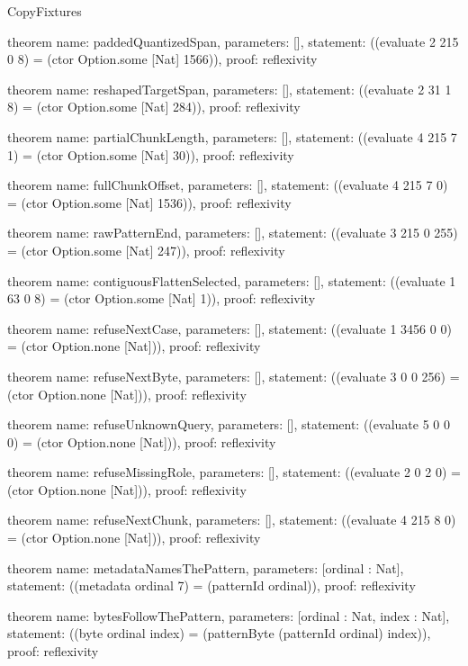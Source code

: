 \begin{lexlean}{CopyFixtures}
\begin{semanticmodule}
theorem{
  name: paddedQuantizedSpan,
  parameters: [],
  statement: ((evaluate 2 215 0 8) = (ctor Option.some [Nat] 1566)),
  proof: reflexivity{}
}

theorem{
  name: reshapedTargetSpan,
  parameters: [],
  statement: ((evaluate 2 31 1 8) = (ctor Option.some [Nat] 284)),
  proof: reflexivity{}
}

theorem{
  name: partialChunkLength,
  parameters: [],
  statement: ((evaluate 4 215 7 1) = (ctor Option.some [Nat] 30)),
  proof: reflexivity{}
}

theorem{
  name: fullChunkOffset,
  parameters: [],
  statement: ((evaluate 4 215 7 0) = (ctor Option.some [Nat] 1536)),
  proof: reflexivity{}
}

theorem{
  name: rawPatternEnd,
  parameters: [],
  statement: ((evaluate 3 215 0 255) = (ctor Option.some [Nat] 247)),
  proof: reflexivity{}
}

theorem{
  name: contiguousFlattenSelected,
  parameters: [],
  statement: ((evaluate 1 63 0 8) = (ctor Option.some [Nat] 1)),
  proof: reflexivity{}
}

theorem{
  name: refuseNextCase,
  parameters: [],
  statement: ((evaluate 1 3456 0 0) = (ctor Option.none [Nat])),
  proof: reflexivity{}
}

theorem{
  name: refuseNextByte,
  parameters: [],
  statement: ((evaluate 3 0 0 256) = (ctor Option.none [Nat])),
  proof: reflexivity{}
}

theorem{
  name: refuseUnknownQuery,
  parameters: [],
  statement: ((evaluate 5 0 0 0) = (ctor Option.none [Nat])),
  proof: reflexivity{}
}

theorem{
  name: refuseMissingRole,
  parameters: [],
  statement: ((evaluate 2 0 2 0) = (ctor Option.none [Nat])),
  proof: reflexivity{}
}

theorem{
  name: refuseNextChunk,
  parameters: [],
  statement: ((evaluate 4 215 8 0) = (ctor Option.none [Nat])),
  proof: reflexivity{}
}

theorem{
  name: metadataNamesThePattern,
  parameters: [ordinal : Nat],
  statement: ((metadata ordinal 7) = (patternId ordinal)),
  proof: reflexivity{}
}

theorem{
  name: bytesFollowThePattern,
  parameters: [ordinal : Nat, index : Nat],
  statement: ((byte ordinal index) = (patternByte (patternId ordinal) index)),
  proof: reflexivity{}
}
\end{semanticmodule}
\end{lexlean}
